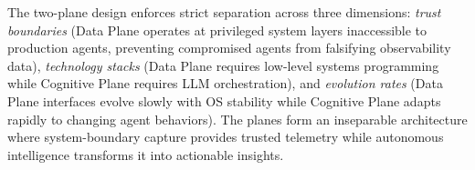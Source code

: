 \documentclass[sigplan,screen,9pt]{acmart}
\begin{document}
The two-plane design enforces strict separation across three dimensions: \emph{trust boundaries} (Data Plane operates at privileged system layers inaccessible to production agents, preventing compromised agents from falsifying observability data), \emph{technology stacks} (Data Plane requires low-level systems programming while Cognitive Plane requires LLM orchestration), and \emph{evolution rates} (Data Plane interfaces evolve slowly with OS stability while Cognitive Plane adapts rapidly to changing agent behaviors). The planes form an inseparable architecture where system-boundary capture provides trusted telemetry while autonomous intelligence transforms it into actionable insights.





\end{document}
